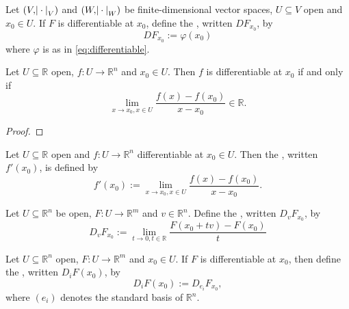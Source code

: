 \begin{definition}[Differential]
	Let $(V,\abs{\>\cdot\>}_V)$ and $(W,\abs{\>\cdot\>}_W)$ be finite-dimensional vector spaces, $U \subseteq V$ open and $x_0 \in U$. If $F$ is differentiable at $x_0$, define the , written $DF_{x_0}$, by
	\begin{equation*}
		DF_{x_0} := \varphi(x_0)
	\end{equation*}
	\noindent where $\varphi$ is as in \textup{\ref{eq:differentiable}}.
\end{definition}

\begin{lemma}
	Let $U \subseteq \mathbb{R}$ open, $f : U \to \mathbb{R}^n$ and $x_0 \in U$. Then $f$ is differentiable at $x_0$ if and only if 
	\begin{equation}
		\lim_{x \to x_0, x \in U} \frac{f(x) - f(x_0)}{x - x_0} \in \mathbb{R}.
	\end{equation}
\end{lemma}

\begin{proof}
	
\end{proof}

\begin{definition}[Derivative]
	Let $U \subseteq \mathbb{R}$ open and $f : U \to \mathbb{R}^n$ differentiable at $x_0 \in U$. Then the , written $f'(x_0)$, is defined by
	\begin{equation*}
		f'(x_0) := \lim_{x \to x_0, x \in U} \frac{f(x) - f(x_0)}{x - x_0}.
	\end{equation*}
\end{definition}

\begin{definition}
	Let $U \subseteq \mathbb{R}^n$ be open, $F : U \to \mathbb{R}^m$ and $v \in \mathbb{R}^n$. Define the , written $D_vF_{x_0}$, by
	\begin{equation*}
		D_vF_{x_0} := \lim_{t \to 0, t \in \mathbb{R}}\frac{F(x_0 + tv) - F(x_0)}{t}
	\end{equation*} 
\end{definition}

\begin{definition}
	Let $U \subseteq \mathbb{R}^n$ open, $F : U \to \mathbb{R}^m$ and $x_0 \in U$. If $F$ is differentiable at $x_0$, then define the , written $D_iF(x_0)$, by
	\begin{equation*}
		D_iF(x_0) := D_{e_i}F_{x_0},
	\end{equation*} 
	\noindent where $(e_i)$ denotes the standard basis of $\mathbb{R}^n$.
\end{definition}

